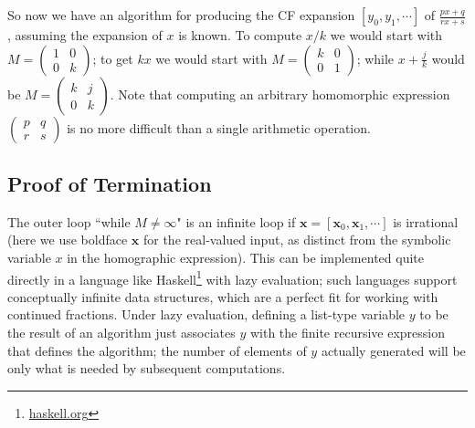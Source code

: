 \documentclass[11pt, oneside]{amsart}   	%
\newcommand{\pqrs}{\left(
\begin{smallmatrix} 
p & q\\ 
r & s 
\end{smallmatrix}
\right)}
\renewcommand{\:}{\negthickspace:\negthickspace}
\begin{document}
So now we have an algorithm for producing the CF expansion $[y_0,y_1,\cdots]$ of $\frac{px+q}{rx+s}$,
assuming the expansion of $x$ is known.
To compute $x/k$ we would start with $M=\left(
\begin{smallmatrix} 
1 & 0\\ 
0 & k 
\end{smallmatrix}
\right)$; 
to get $kx$ we would start with $M=\left(
\begin{smallmatrix} 
k & 0\\ 
0 & 1 
\end{smallmatrix}
\right)$; while $x+\frac{j}{k}$ would be $M=\left(
\begin{smallmatrix} 
k & j\\ 
0 & k 
\end{smallmatrix}
\right)$. Note that computing an arbitrary homomorphic expression $\pqrs$ is no more difficult than a single arithmetic operation.


\subsection{Proof of Termination}
The outer loop ``while $M \neq \infty$" is an infinite loop if $\mathbf{x} = [\mathbf{x}_0, \mathbf{x}_1,\cdots]$ is irrational
(here we use boldface $\mathbf{x}$ for the real-valued input, as distinct from the symbolic variable $x$ in the homographic
expression). This can be implemented quite directly in a language like Haskell\footnote{\href{https://haskell.org}{haskell.org}} with
lazy evaluation\cite{hutton2007programming}; such languages support conceptually infinite data structures, which are a perfect fit for working with continued
fractions. Under lazy evaluation, defining a list-type variable $y$ to be the result of an algorithm just associates $y$ with the finite recursive
expression that defines the algorithm; the number of elements of $y$ actually generated will be only what is needed by subsequent computations.
\end{document}
